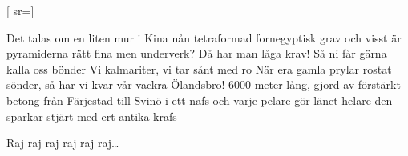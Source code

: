 
[
sr={}]

\beginverse*
Det talas om en liten mur i Kina
nån tetraformad fornegyptisk grav
och visst är pyramiderna rätt fina
men underverk? Då har man låga krav!
Så ni får gärna kalla oss bönder
Vi kalmariter, vi tar sånt med ro
När era gamla prylar rostat sönder,
så har vi kvar vår vackra Ölandsbro!
6000 meter lång, gjord av förstärkt betong
från Färjestad till Svinö i ett nafs
och varje pelare gör länet helare
den sparkar stjärt med ert antika krafs
\endverse

\beginchorus
Raj raj raj raj raj raj…
\endchorus
\endsong